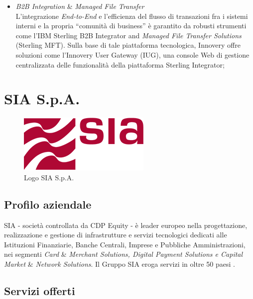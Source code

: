 \begin{itemize}
    \item \textit{B2B Integration} \& \textit{Managed File Transfer} \\
L’integrazione \textit{End-to-End} e l’efficienza del flusso di transazioni fra i sistemi interni e la
propria “comunità di business” è garantito da robusti strumenti come l’IBM Sterling B2B Integrator and \textit{Managed File Transfer Solutions} (Sterling MFT). Sulla base di tale piattaforma
tecnologica, Innovery offre soluzioni come l’Innovery User Gateway (IUG), una
console Web di gestione centralizzata delle funzionalità della piattaforma Sterling Integrator;
\end{itemize}

\clearpage

\section{SIA S.p.A.}
\label{sec:sia}

\begin{figure}
\begin{center}
\includegraphics[width=0.5\columnwidth]{images/logo_sia.png}
\end{center}
\caption{Logo SIA S.p.A.}
\label{fig:logo_sia}
\end{figure}

\subsection{Profilo aziendale}
\label{subsec:siaprofilo}
SIA - società controllata da CDP Equity - è leader europeo nella progettazione, realizzazione e gestione di infrastrutture e servizi tecnologici dedicati alle Istituzioni Finanziarie, Banche Centrali, Imprese e Pubbliche Amministrazioni, nei segmenti \textit{Card} \& \textit{Merchant Solutions, Digital Payment Solutions e Capital Market} \& \textit{Network Solutions}. Il Gruppo SIA eroga servizi in oltre 50 paesi \cite{sia}.


\subsection{Servizi offerti}
\label{subsec:siaservizi}


